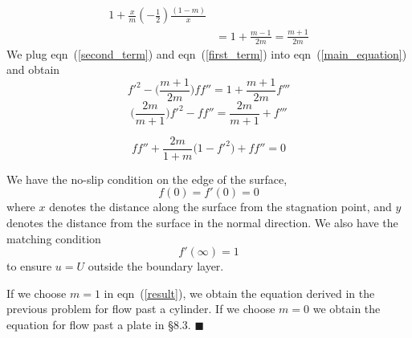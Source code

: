 \documentclass[11pt]{article}
\newcommand{\eqn}[2]{
  \begin{equation}
    \label{#1}
    #2
  \end{equation}
}
\newcommand{\eqr}[1]{eqn~(\ref{#1})}
\begin{document}
\begin{description}
\begin{align}
  1
  + \frac{x}{m}
  (-\frac{1}{2})
  \frac{(1-m)}{x}
  \\
%
%
  \label{first_term}
  &=
  1
  + \frac{m - 1}{2m}
  =
  \frac{m + 1}{2m}
\end{align}
We plug \eqr{second_term} and \eqr{first_term} into \eqr{main_equation} and
obtain
$$
  f'^2
  - \bigg(
  \frac{m + 1}{2m}
  \bigg) ff''
  =
  1
  + \frac{m + 1}{2m} f'''
$$
$$
  \bigg(\frac{2m}{m+1}\bigg) f'^2
  - ff''
  =
  \frac{2m}{m+1}
  + f'''
$$
\eqn{result}{
  ff'' 
  + \frac{2m}{1 + m}
  \bigg(1 - f'^2 \bigg)
  + ff''
  =
  0
}
We have the no-slip condition on the edge of the surface,
$$
  f(0) = f'(0) = 0
$$
where $x$ denotes the distance along the surface from the stagnation point, and
$y$ denotes the distance from the surface in the normal direction. We
also have the matching condition
$$
  f'(\infty) = 1
$$
to ensure $u = U$ outside the boundary layer.

If we choose $m = 1$ in \eqr{result}, we obtain the equation derived in the
previous problem for flow past a cylinder. If we choose $m = 0$ we obtain the
equation for flow past a plate in \S 8.3.
\hfill $\blacksquare$
\end{description}
\end{document}
